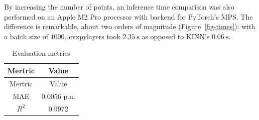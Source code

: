 \documentclass[
]{article}
\begin{document}
By increasing the number of points, an inference time comparison was
also performed on an Apple M2 Pro processor with backend for PyTorch's
MPS. The difference is remarkable, about two orders of magnitude
(Figure~\ref{fig-times}): with a batch size of \(1000\), cvxpylayers
took \(2.35~\textrm{s}\) as opposed to KINN's \(0.06~\textrm{s}\).

\begin{longtable}[]{@{}cc@{}}
\caption{Evaluation metrics}\label{tbl-eval}\tabularnewline
\toprule\noalign{}
Mertric & Value \\
\midrule\noalign{}
\endfirsthead
\toprule\noalign{}
Mertric & Value \\
\midrule\noalign{}
\endhead
\bottomrule\noalign{}
\endlastfoot
MAE & 0.0056 p.u. \\
\(R^{2}\) & 0.9972 \\
\end{longtable}
\end{document}
